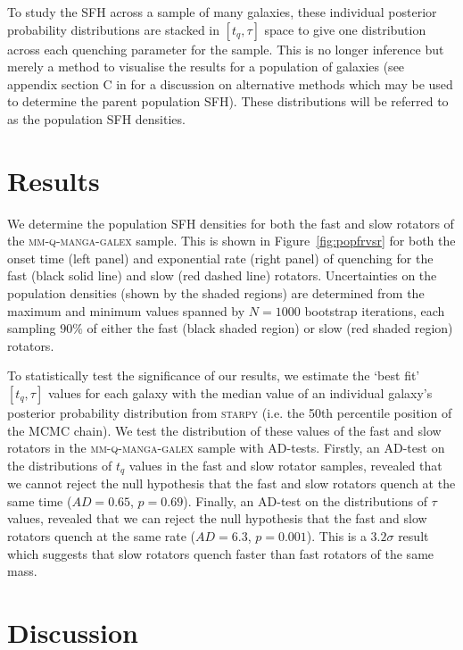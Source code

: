 \documentclass[useAMS,usenatbib]{mn2e}
\begin{document}
To study the SFH across a sample of many galaxies, these individual posterior probability distributions are stacked in $[t_q, \tau]$ space to give one distribution across each quenching parameter for the sample. This is no longer inference but merely a method to visualise the results for a population of galaxies (see appendix section C in \citealt{smethurst16} for a discussion on alternative methods which may be used to determine the parent population SFH). These distributions will be referred to as the population SFH densities.

\section{Results}\label{sec:results}

We determine the population SFH densities for both the fast and slow rotators of the \textsc{mm-q-manga-galex} sample. This is shown in Figure~\ref{fig:popfrvsr} for both the onset time (left panel) and exponential rate (right panel) of quenching for the fast (black solid line) and slow (red dashed line) rotators. Uncertainties on the population densities (shown by the shaded regions) are determined from the maximum and minimum values spanned by $N = 1000$ bootstrap iterations, each sampling $90\%$ of either the fast (black shaded region) or slow (red shaded region) rotators. 

To statistically test the significance of our results, we estimate the `best fit' $[t_q, \tau]$ values for each galaxy with the median value of an individual galaxy's posterior probability distribution from \textsc{starpy} (i.e. the 50th percentile position of the MCMC chain). We test the distribution of these values of the fast and slow rotators in the \textsc{mm-q-manga-galex} sample with AD-tests. Firstly, an AD-test on the distributions of $t_q$ values in the fast and slow rotator samples, revealed that we cannot reject the null hypothesis that the fast and slow rotators quench at the same time ($AD= 0.65$, $p = 0.69$). Finally, an AD-test on the distributions of $\tau$ values, revealed that we can reject the null hypothesis that the fast and slow rotators quench at the same rate ($AD= 6.3$, $p = 0.001$). This is a $3.2\sigma$ result which suggests that slow rotators quench faster than fast rotators of the same mass.


\section{Discussion}\label{sec:discussion}
\end{document}
